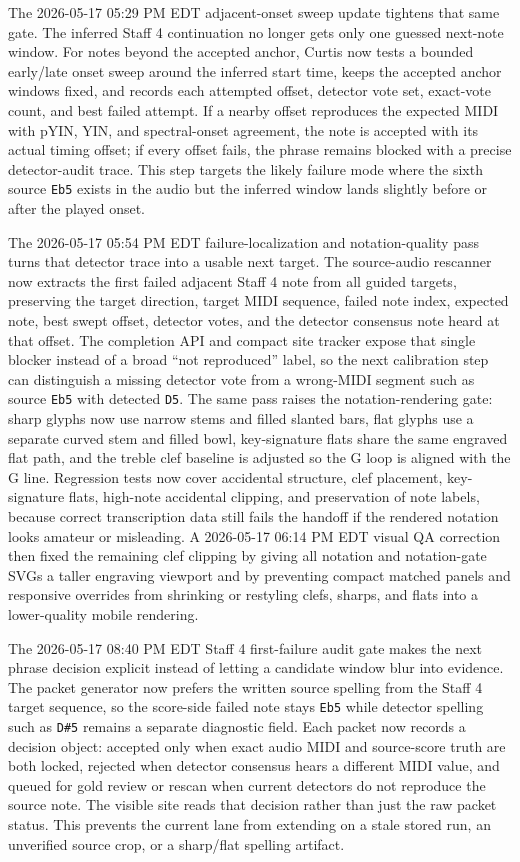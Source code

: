 \documentclass[12pt,letterpaper]{article}
\begin{document}
The 2026-05-17 05:29 PM EDT adjacent-onset sweep update tightens that same gate. The inferred Staff 4 continuation no longer gets only one guessed next-note window. For notes beyond the accepted anchor, Curtis now tests a bounded early/late onset sweep around the inferred start time, keeps the accepted anchor windows fixed, and records each attempted offset, detector vote set, exact-vote count, and best failed attempt. If a nearby offset reproduces the expected MIDI with pYIN, YIN, and spectral-onset agreement, the note is accepted with its actual timing offset; if every offset fails, the phrase remains blocked with a precise detector-audit trace. This step targets the likely failure mode where the sixth source \texttt{Eb5} exists in the audio but the inferred window lands slightly before or after the played onset.

The 2026-05-17 05:54 PM EDT failure-localization and notation-quality pass turns that detector trace into a usable next target. The source-audio rescanner now extracts the first failed adjacent Staff 4 note from all guided targets, preserving the target direction, target MIDI sequence, failed note index, expected note, best swept offset, detector votes, and the detector consensus note heard at that offset. The completion API and compact site tracker expose that single blocker instead of a broad ``not reproduced'' label, so the next calibration step can distinguish a missing detector vote from a wrong-MIDI segment such as source \texttt{Eb5} with detected \texttt{D5}. The same pass raises the notation-rendering gate: sharp glyphs now use narrow stems and filled slanted bars, flat glyphs use a separate curved stem and filled bowl, key-signature flats share the same engraved flat path, and the treble clef baseline is adjusted so the G loop is aligned with the G line. Regression tests now cover accidental structure, clef placement, key-signature flats, high-note accidental clipping, and preservation of note labels, because correct transcription data still fails the handoff if the rendered notation looks amateur or misleading. A 2026-05-17 06:14 PM EDT visual QA correction then fixed the remaining clef clipping by giving all notation and notation-gate SVGs a taller engraving viewport and by preventing compact matched panels and responsive overrides from shrinking or restyling clefs, sharps, and flats into a lower-quality mobile rendering.

The 2026-05-17 08:40 PM EDT Staff 4 first-failure audit gate makes the next phrase decision explicit instead of letting a candidate window blur into evidence. The packet generator now prefers the written source spelling from the Staff 4 target sequence, so the score-side failed note stays \texttt{Eb5} while detector spelling such as \texttt{D\#5} remains a separate diagnostic field. Each packet now records a decision object: accepted only when exact audio MIDI and source-score truth are both locked, rejected when detector consensus hears a different MIDI value, and queued for gold review or rescan when current detectors do not reproduce the source note. The visible site reads that decision rather than just the raw packet status. This prevents the current lane from extending on a stale stored run, an unverified source crop, or a sharp/flat spelling artifact.
\end{document}
